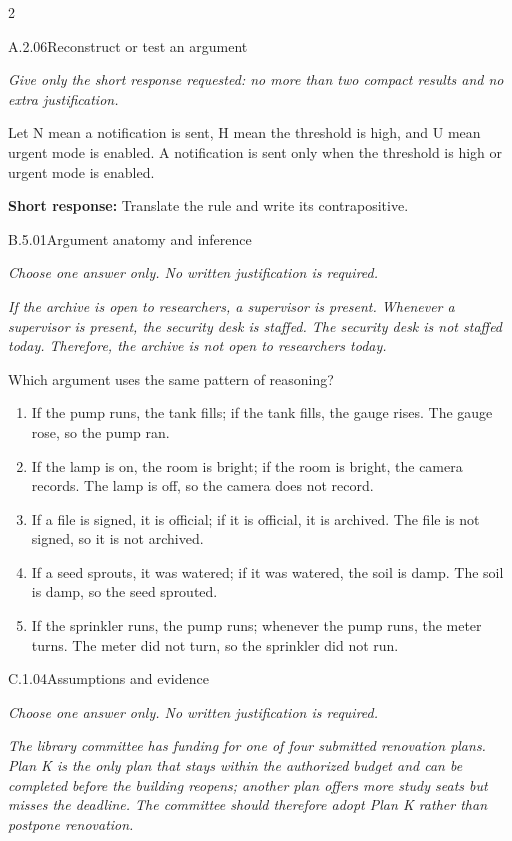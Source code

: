 \documentclass[9pt]{extarticle}
\newcommand{\choice}[1]{\item #1}
\begin{document}
\begin{multicols}{2}
\begin{DenseCoreProblem}{A.2.06}{Reconstruct or test an argument}
{\scriptsize\textit{Give only the short response requested: no more than two compact results and no extra justification.}\par}
Let N mean a notification is sent, H mean the threshold is high, and U mean urgent mode is enabled. A notification is sent only when the threshold is high or urgent mode is enabled.

\textbf{Short response:} Translate the rule and write its contrapositive.
\end{DenseCoreProblem}
\begin{DenseCoreProblem}{B.5.01}{Argument anatomy and inference}
{\scriptsize\textit{Choose one answer only. No written justification is required.}\par}
\emph{If the archive is open to researchers, a supervisor is present. Whenever a supervisor is present, the security desk is staffed. The security desk is not staffed today. Therefore, the archive is not open to researchers today.}

Which argument uses the same pattern of reasoning?
\begin{enumerate}[label=(\alph*)]
  \choice{If the pump runs, the tank fills; if the tank fills, the gauge rises. The gauge rose, so the pump ran.}
  \choice{If the lamp is on, the room is bright; if the room is bright, the camera records. The lamp is off, so the camera does not record.}
  \choice{If a file is signed, it is official; if it is official, it is archived. The file is not signed, so it is not archived.}
  \choice{If a seed sprouts, it was watered; if it was watered, the soil is damp. The soil is damp, so the seed sprouted.}
  \choice{If the sprinkler runs, the pump runs; whenever the pump runs, the meter turns. The meter did not turn, so the sprinkler did not run.}
\end{enumerate}
\end{DenseCoreProblem}
\columnbreak
\begin{DenseCoreProblem}{C.1.04}{Assumptions and evidence}
{\scriptsize\textit{Choose one answer only. No written justification is required.}\par}
\emph{The library committee has funding for one of four submitted renovation plans. Plan K is the only plan that stays within the authorized budget and can be completed before the building reopens; another plan offers more study seats but misses the deadline. The committee should therefore adopt Plan K rather than postpone renovation.}


\end{DenseCoreProblem}
\end{multicols}
\end{document}
